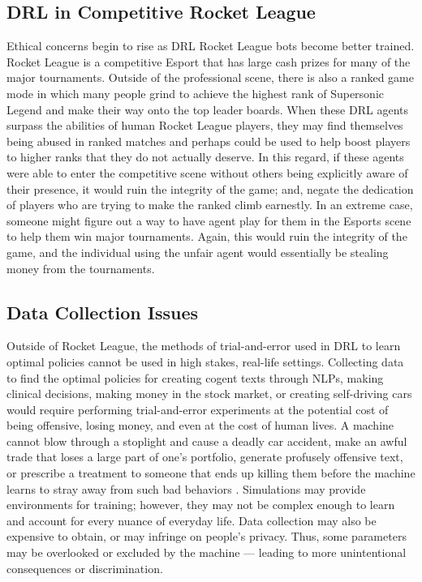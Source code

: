 \documentclass[10pt,twocolumn]{article}
\begin{document}
\subsection{DRL in Competitive Rocket League}
 Ethical concerns begin to rise as DRL Rocket League bots 
 become better trained. Rocket League is a competitive Esport 
 that has large cash prizes for many of the major 
 tournaments. Outside of the professional scene, there is 
 also a ranked game mode in which many people grind to 
 achieve the highest rank of Supersonic Legend and make their 
 way onto the top leader boards. When these DRL agents 
 surpass the abilities of human Rocket League players, they 
 may find themselves being abused in ranked matches and 
 perhaps could be used to help boost players to higher ranks 
 that they do not actually deserve. In this regard, if these 
 agents were able to enter the competitive scene without 
 others being explicitly aware of their presence, it would 
 ruin the integrity of the game; and, negate the dedication 
 of players who are trying to make the ranked climb 
 earnestly. In an extreme case, someone might figure out a 
 way to have agent play for them in the Esports scene to help 
 them win major tournaments. Again, this would ruin the 
 integrity of the game, and the individual using the unfair 
 agent would essentially be stealing money from the 
 tournaments.

\subsection{Data Collection Issues}

 Outside of Rocket League, the methods of trial-and-error 
 used in DRL to learn optimal policies cannot be used in high 
 stakes, real-life settings. Collecting data to find the 
 optimal policies for creating cogent texts through NLPs, 
 making clinical decisions, making money in the stock market, 
 or creating self-driving cars would require performing trial-and-error experiments at the potential cost of being 
 offensive, losing money, and even at the cost of human 
 lives. A machine cannot blow through a stoplight and cause a 
 deadly car accident, make an awful trade that loses a large 
 part of one's portfolio, generate profusely offensive text, 
 or prescribe a treatment to someone that ends up killing 
 them before the machine learns to stray away from such bad 
 behaviors \cite{10.1613/jair.1.12360}. Simulations may 
 provide environments for training; however, they may not be 
 complex enough to learn and account for every nuance of 
 everyday life. Data collection may also be expensive to 
 obtain, or may infringe on people's privacy. Thus, some 
 parameters may be overlooked or excluded by the machine — 
 leading to more unintentional consequences or discrimination.
\end{document}
